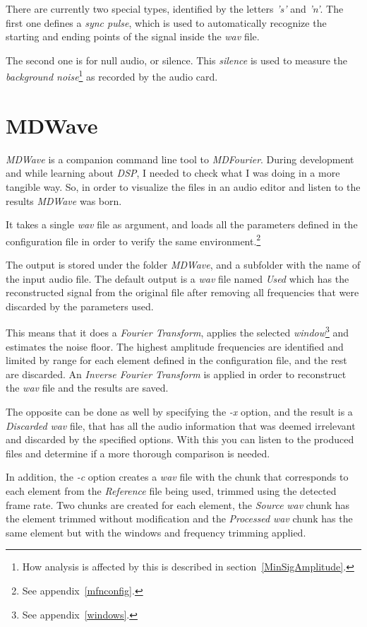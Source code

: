 \documentclass[10pt,a4paper]{report}
\newcommand{\ac}[1]{\textit{\mbox{\acrshort{#1}}}}
\begin{document}
\begin{appendices}
There are currently two special types, identified by the letters \textit{'s'} and \textit{'n'}. The first one defines a \textit{sync pulse}, which is used to automatically recognize the starting and ending points of the signal inside the \ac{wav} file. 

The second one is for null audio, or silence. This \textit{silence} is used to measure the \textit{background noise}\footnote{How analysis is affected by this is described in section~\ref{MinSigAmplitude}.} as recorded by the audio card. 	

\chapter{MDWave}
\label{mdwave}

\textit{MDWave} is a companion command line tool to \textit{MDFourier}. During development and while learning about \textit{DSP}, I needed to check what I was doing in a more tangible way. So, in order to visualize the files in an audio editor and listen to the results \textit{MDWave} was born.

It takes a single \ac{wav} file as argument, and loads all the parameters defined in the configuration file in order to verify the same environment.\footnote{See appendix~\ref{mfnconfig}.}

The output is stored under the folder \textit{MDWave}, and a subfolder with the name of the input audio file. The default output is a \ac{wav} file named \textit{Used} which has the reconstructed signal from the original file after removing all frequencies that were discarded by the parameters used.

This means that it does a \textit{Fourier Transform}, applies the selected \textit{window}\footnote{See appendix~\ref{windows}.} and estimates the noise floor. The highest amplitude frequencies are identified and limited by range for each element defined in the configuration file, and the rest are discarded. An \textit{Inverse Fourier Transform} is applied in order to reconstruct the \ac{wav} file and the results are saved.

The opposite can be done as well by specifying the \textit{-x} option, and the result is a \textit{Discarded} \ac{wav} file, that has all the audio information that was deemed irrelevant and discarded by the specified options. With this you can listen to the produced files and determine if a more thorough comparison is needed.

In addition, the \textit{-c} option creates a \ac{wav} file with the chunk that corresponds to each element from the \textit{Reference} file being used, trimmed using the detected frame rate. Two chunks are created for each element, the \textit{Source} \ac{wav} chunk has the element trimmed without modification and the \textit{Processed} \ac{wav} chunk has the same element but with the windows and frequency trimming applied.


\end{appendices}
\end{document}
